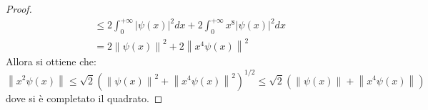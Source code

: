 \documentclass[10pt, a4paper]{scrartcl} %
\numberwithin{equation}{section}
\theoremstyle{style2}
\theoremstyle{style1}
\begin{document}
\begin{proof}
\[\begin{split}
						     &\le 2 \int_{0} ^{+\infty} \lvert \psi (x) \rvert ^2 dx + 2 \int_{0} ^{+\infty} x^8 \lvert \psi (x) \rvert ^2 dx \\
						     &= 2 \left\lVert \psi (x) \right\rVert ^2 + 2 \left\lVert x^4 \psi (x) \right\rVert ^2
	\end{split}
	\] 
Allora si ottiene che:
\[
\left\lVert x^2 \psi (x) \right\rVert \le \sqrt{2}  \left(\left\lVert \psi (x) \right\rVert ^2 + \left\lVert x^4 \psi (x) \right\rVert ^2\right) ^{1 / 2} \le \sqrt{2} \left(\left\lVert \psi (x) \right\rVert + \left\lVert x^4 \psi (x) \right\rVert \right) 
\] 
dove si \`e completato il quadrato.
\end{proof}
\end{document}
